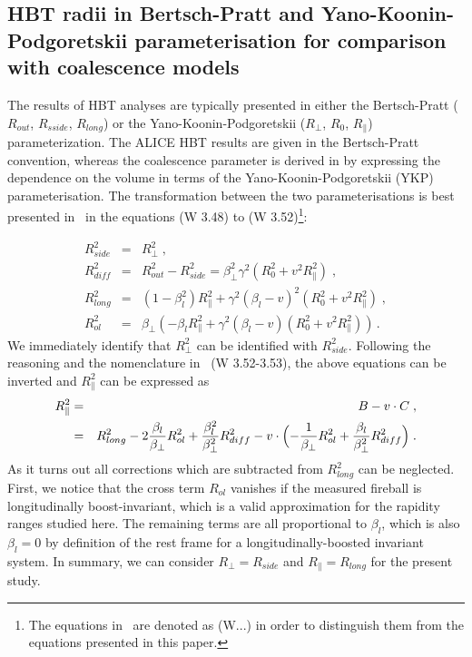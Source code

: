 \documentclass[a4paper,11pt]{scrartcl} %
\begin{document}
\begin{appendix}
\section{HBT radii in Bertsch-Pratt and Yano-Koonin-Podgoretskii parameterisation for comparison with coalescence models}
The results of HBT analyses are typically presented in either the Bertsch-Pratt ($R_{out}$, $R_{sside}$, $R_{long}$) or the Yano-Koonin-Podgoretskii ($R_{\perp}$, $R_{0}$, $R_{\parallel}$) parameterization. The ALICE HBT results \cite{Aamodt:2011mr, Adam:2015vna} are given in the Bertsch-Pratt convention, whereas the coalescence parameter is derived in \cite{Scheibl:1998tk} by expressing the dependence on the volume in terms of the Yano-Koonin-Podgoretskii (YKP) parameterisation. 
The transformation between the two parameterisations is best presented in~\cite{Wiedemann:1999qn} in the equations (W 3.48) to (W 3.52)\footnote{The equations in~\cite{Wiedemann:1999qn} are denoted as (W...) in order to distinguish them from the equations presented in this paper.}:

\begin{eqnarray}
R_{side}^{2}    &=& R_{\perp}^{2}  \;, \\
R_{diff}^{2} &=& R_{out}^{2} -  R_{side}^{2} = \beta_{\perp}^2 \gamma^2 (R_{0}^2 + v^2R_{\parallel}^2) \;, \\
R_{long}^{2}     &=& (1 - \beta_l^2) R_{\parallel}^2 + \gamma^2 (\beta_l - v)^2 (R_{0}^2 + v^2R_{\parallel}^2) \;, \\
R_{ol}^{2}   &=& \beta_{\perp} (-\beta_l R_{\parallel}^{2} +  \gamma^2 (\beta_l - v)(R_{0}^2 + v^2R_{\parallel}^2)) \,.
\end{eqnarray}
%
We immediately identify that $R_{\perp}^2$ can be identified with $R_{side}^{2}$. Following the reasoning and the nomenclature in~\cite{Wiedemann:1999qn} (W 3.52-3.53), the above equations can be inverted and $R_{\parallel}^{2}$ can be expressed as 
%
\begin{eqnarray}
R_{\parallel}^{2} &=& B  - v \cdot C \;, \\
                          &=& R_{long}^2 - 2{\beta_l \over \beta_\perp}  R_{ol}^2 + {\beta_l^2 \over \beta_\perp^2} R_{diff}^2 
                          - v \cdot \Bigl(-{1 \over \beta_\perp } R_{ol}^2 + {\beta_l \over \beta_\perp^2} R_{diff}^2  \Bigr) \; .
\end{eqnarray}
%
As it turns out all corrections which are subtracted from $R_{long}^{2}$ can be neglected. First, we notice that the cross term $R_{ol}$ vanishes if the measured fireball is longitudinally boost-invariant, which is a valid approximation for the rapidity ranges studied here. The remaining terms are all proportional to $\beta_l$, which is also $\beta_l = 0$ by definition of the rest frame for a longitudinally-boosted invariant system. In summary, we can consider $R_{\perp} = R_{side}$ and $R_{\parallel}=R_{long}$ for the present study.



\end{appendix}
\end{document}
